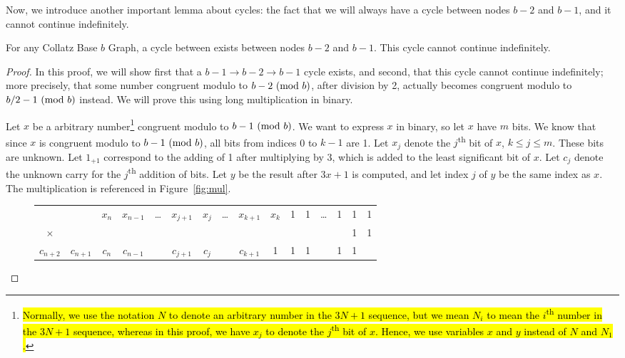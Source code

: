 Now, we introduce another important lemma about cycles: the fact that we will always have a cycle between nodes $b-2$ and $b-1$, and it cannot continue indefinitely.
\begin{lemma}
\label{lem:oneConsumption}
 For any Collatz Base $b$ Graph, a cycle between exists between nodes $b-2$ and $b-1$. This cycle cannot continue indefinitely.
\end{lemma}
\begin{proof}
In this proof, we will show first that a $b-1 \rightarrow b-2 \rightarrow b-1$ cycle exists, and second, that this cycle cannot continue indefinitely; more precisely, that some number congruent modulo to $b-2 \ (\mathrm{mod}\ b)$, after division by 2, actually becomes congruent modulo to $b/2-1 \ (\mathrm{mod}\ b)$ instead. We will prove this using long multiplication in binary. \par
Let $x$ be a arbitrary number\footnote{\hl{Normally, we use the notation $N$ to denote an arbitrary number in the $3N+1$ sequence, but we mean $N_i$ to mean the $i$\textsuperscript{th} number in the $3N+1$ sequence, whereas in this proof, we have $x_j$ to denote the $j$\textsuperscript{th} bit of $x$. Hence, we use variables $x$ and $y$ instead of $N$ and $N_1$.}} congruent modulo to $b-1 \ (\mathrm{mod}\ b)$. We want to express $x$ in binary, so let $x$ have $m$ bits. We know that since $x$ is congruent modulo to $b-1 \ (\mathrm{mod}\ b)$, all bits from indices 0 to $k-1$ are 1. Let $x_j$ denote the $j$\textsuperscript{th} bit of $x$, $k \leq j \leq m$. These bits are unknown. Let $1_{+1}$ correspond to the adding of 1 after multiplying by 3, which is added to the least significant bit of $x$. Let $c_j$ denote the unknown carry for the $j$\textsuperscript{th} addition of bits. Let $y$ be the result after $3x+1$ is computed, and let index $j$ of $y$ be the same index as $x$. The multiplication is referenced in Figure~\ref{fig:mul}. \par
\begin{figure}
\begin{tabular}{*{16}c}%
 & & $ x_{n}$  & $ x_{n-1}$  & \ldots & $ x_{j+1}$  & $ x_{j}$  & \ldots & $ x_{k+1}$  & $ x_{k}$  & 1 & 1 & \ldots & 1 & 1 & 1 \\
$\times$ & & & & & & & & & & & & & & 1 & 1 \\
\hline
\tiny ${\scriptscriptstyle c_{n+2}}$ & ${\scriptscriptstyle c_{n+1}}$ & ${\scriptscriptstyle c_{n}}$ & ${\scriptscriptstyle c_{n-1}}$ & & ${\scriptscriptstyle c_{j+1}}$ & ${\scriptscriptstyle c_{j}}$ & & ${\scriptscriptstyle c_{k+1}}$ & \tiny 1 & \tiny 1 &  \tiny 1 & &  \tiny 1 & \tiny 1 & \\

\end{tabular}
\end{figure}
\end{proof}
